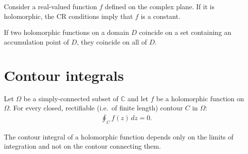     \begin{property}
        Consider a real-valued function $f$ defined on the complex plane. If it is holomorphic, the CR conditions imply that $f$ is a constant.
    \end{property}

    \begin{theorem}
        If two holomorphic functions on a domain $D$ coincide on a set containing an accumulation point of $D$, they coincide on all of $D$.
    \end{theorem}

\section{Contour integrals}



    \begin{theorem}\label{complex:cauchy_integral_theorem}
        Let $\Omega$ be a simply-connected subset of $\mathbb{C}$ and let $f$ be a holomorphic function on $\Omega$. For every closed, rectifiable (i.e.~of finite length) contour $C$ in $\Omega$:
        \begin{gather}
            \oint_Cf(z)\,dz = 0.
        \end{gather}
    \end{theorem}
    \begin{result}
        The contour integral of a holomorphic function depends only on the limits of integration and not on the contour connecting them.
    \end{result}


